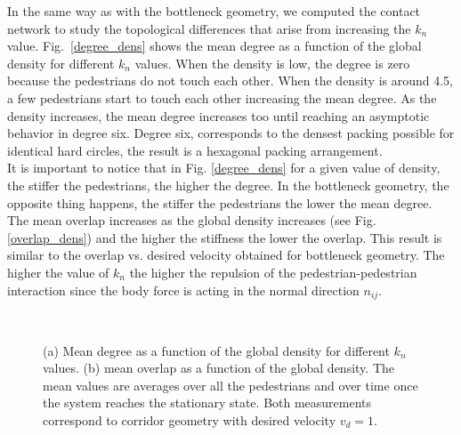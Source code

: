\documentclass[preprint,12pt]{elsarticle}
\begin{document}
In the same way as with the bottleneck geometry, we computed the contact network to study the topological differences that arise from increasing the $k_n$ value. Fig.~\ref{degree_dens} shows the mean degree as a function of the global density for different $k_n$ values. When the density is low,  the degree is zero because the pedestrians do not touch each other. When the density is around 4.5, a few pedestrians start to touch each other increasing the mean degree. As the density increases, the mean degree increases too until reaching an asymptotic behavior in degree six. Degree six, corresponds to the densest packing possible for identical hard circles, the result is a hexagonal packing arrangement.\\

It is important to notice that in Fig. \ref{degree_dens} for a given value of density, the stiffer the pedestrians, the higher the degree. In the bottleneck geometry, the opposite thing happens, the stiffer the pedestrians the lower the mean degree.\\

The mean overlap increases as the global density increases (see Fig. \ref{overlap_dens}) and the higher the stiffness the lower the overlap. This result is similar to the overlap vs. desired velocity obtained for bottleneck geometry. The higher the value of $k_n$ the higher the repulsion of the pedestrian-pedestrian interaction since the body force is acting in the normal direction $n_{ij}$.\\

\begin{figure}[!htbp]
\centering
    \ 
    \\
\caption[width=0.47\columnwidth]{(a) Mean degree as a function of the global density for different $k_n$ values. (b) mean overlap as a function of the global density. The mean values are averages over all the pedestrians and over time once the system reaches the stationary state. Both measurements correspond to corridor geometry with desired velocity $v_d=1$.}
\label{network_corridor}
\end{figure}
\end{document}
